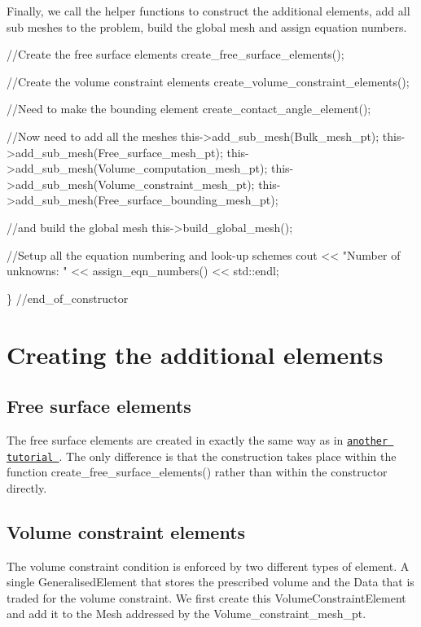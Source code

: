 Finally, we call the helper functions to construct the additional elements, add all sub meshes to the problem, build the global mesh and assign equation numbers.


\begin{DoxyCodeInclude}
 
 \textcolor{comment}{//Create the free surface elements}
 create\_free\_surface\_elements();

 \textcolor{comment}{//Create the volume constraint elements}
 create\_volume\_constraint\_elements();

 \textcolor{comment}{//Need to make the bounding element}
 create\_contact\_angle\_element();

 \textcolor{comment}{//Now need to add all the meshes}
 this->add\_sub\_mesh(Bulk\_mesh\_pt);
 this->add\_sub\_mesh(Free\_surface\_mesh\_pt);
 this->add\_sub\_mesh(Volume\_computation\_mesh\_pt);
 this->add\_sub\_mesh(Volume\_constraint\_mesh\_pt);
 this->add\_sub\_mesh(Free\_surface\_bounding\_mesh\_pt);

 \textcolor{comment}{//and build the global mesh}
 this->build\_global\_mesh();
 
 \textcolor{comment}{//Setup all the equation numbering and look-up schemes }
 cout << \textcolor{stringliteral}{"Number of unknowns: "} << assign\_eqn\_numbers() << std::endl; 
 
\} \textcolor{comment}{//end\_of\_constructor}

\end{DoxyCodeInclude}
\hypertarget{index_elements}{}\section{Creating the additional elements}\label{index_elements}
\hypertarget{index_free}{}\subsection{Free surface elements}\label{index_free}
The free surface elements are created in exactly the same way as in \href{../../single_layer_free_surface/html/index.html}{\tt another tutorial }. The only difference is that the construction takes place within the function {\ttfamily create\+\_\+free\+\_\+surface\+\_\+elements()} rather than within the constructor directly.\hypertarget{index_vol}{}\subsection{Volume constraint elements}\label{index_vol}
The volume constraint condition is enforced by two different types of element. A single {\ttfamily Generalised\+Element} that stores the prescribed volume and the {\ttfamily Data} that is traded for the volume constraint. We first create this {\ttfamily Volume\+Constraint\+Element} and add it to the {\ttfamily Mesh} addressed by the {\ttfamily Volume\+\_\+constraint\+\_\+mesh\+\_\+pt}.


